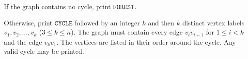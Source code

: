 If the graph contains no cycle, print $\texttt{FOREST}$.

Otherwise, print $\texttt{CYCLE}$ followed by an integer $k$ and then $k$ distinct vertex labels $v_1,v_2,\ldots,v_k$ ($3 \le k \le n$). The graph must contain every edge $v_i v_{i+1}$ for $1 \le i < k$ and the edge $v_kv_1$. The vertices are listed in their order around the cycle. Any valid cycle may be printed.
